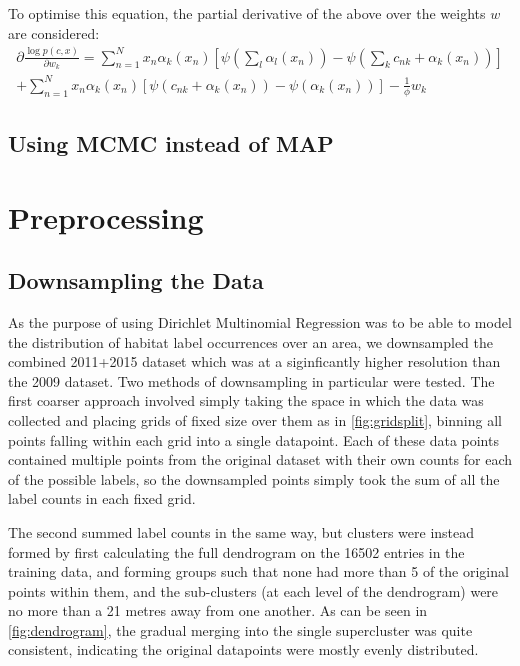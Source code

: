 To optimise this equation, the partial derivative of the above over the weights $w$ are considered:
\begin{multline}
    \partial \frac{\log p(c, x)}{\partial w_k} = \sum_{n=1}^N x_n \alpha_k (x_n) [\psi(\sum_l \alpha_l(x_n)) - \psi(\sum_k c_{nk} + \alpha_k(x_n))] \\
    + \sum^N_{n=1} x_n \alpha_k (x_n) [\psi (c_{nk} + \alpha_k(x_n)) - \psi(\alpha_k(x_n))] - \frac{1}{\phi} w_k
\end{multline}


\subsection{Using MCMC instead of MAP}

\section{Preprocessing}

\subsection{Downsampling the Data}
As the purpose of using Dirichlet Multinomial Regression was to be able to model the distribution of habitat label occurrences over an area, we downsampled the combined 2011+2015 dataset which was at a siginficantly higher resolution than the 2009 dataset. Two methods of downsampling in particular were tested. The first coarser approach involved simply taking the space in which the data was collected and placing grids of fixed size over them as in \cref{fig:gridsplit}, binning all points falling within each grid into a single datapoint. Each of these data points contained multiple points from the original dataset with their own counts for each of the possible labels, so the downsampled points simply took the sum of all the label counts in each fixed grid. 

The second summed label counts in the same way, but clusters were instead formed by first calculating the full dendrogram on the 16502 entries in the training data, and forming groups such that none had more than 5 of the original points within them, and the sub-clusters (at each level of the dendrogram) were no more than a 21 metres away from one another. As can be seen in \cref{fig:dendrogram}, the gradual merging into the single supercluster was quite consistent, indicating the original datapoints were mostly evenly distributed.

